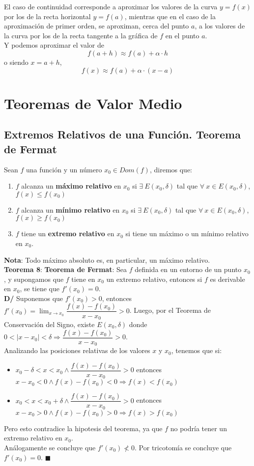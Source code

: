 \documentclass[11pt,a4paper]{article}
\newcommand*{\QEDA}{\null\nobreak\hfill\ensuremath{\blacksquare}}
\begin{document}
\noindent El caso de continuidad corresponde a aproximar los valores de la curva $y=f(x)$ por los de la recta horizontal $y=f(a)$, mientras que en el caso de la aproximaci\'on de primer orden, se aproximan, cerca del punto $a$, a los valores de la curva por los de la recta tangente a la gr\'afica de $f$ en el punto $a$.\\

\noindent Y podemos aproximar el valor de $$f(a+h) \approx f(a) + \alpha \cdot h$$ o siendo $x = a+h$, $$f(x) \approx f(a) + \alpha \cdot (x-a)$$

\newpage
\section{Teoremas de Valor Medio}
\subsection{Extremos Relativos de una Funci\'on. Teorema de Fermat}
Sean $f$ una funci\'on y un n\'umero $x_0 \in Dom(f)$, diremos que:
\begin{enumerate}
\item $f$ alcanza un \textbf{m\'aximo relativo} en $x_0$ si $\exists\ E(x_0, \delta)$ tal que $\forall\ x\in E(x_0, \delta)$, $f(x) \leq f(x_0)$
\item $f$ alcanza un \textbf{m\'inimo relativo} en $x_0$ si $\exists\ E(x_0, \delta)$ tal que $\forall\ x\in E(x_0, \delta)$, $f(x) \geq f(x_0)$
\item $f$ tiene un \textbf{extremo relativo} en $x_0$ si tiene un m\'aximo o un m\'inimo relativo en $x_0$.
\end{enumerate}
\textbf{Nota}: Todo m\'aximo absoluto es, en particular, un m\'aximo relativo.\\

\noindent \textbf{Teorema 8}: \textbf{Teorema de Fermat}:
Sea $f$ definida en un entorno de un punto $x_0$, y supongamos que $f$ tiene en $x_0$ un extremo relativo, entonces si $f$ es derivable en $x_0$, se tiene que $f'(x_0)=0$.\\
\textbf{D/} Suponemos que $f'(x_0) > 0$, entonces $f'(x_0) = \displaystyle{\lim_{x \to x_0} \dfrac{f(x)-f(x_0)}{x-x_0} > 0}$. Luego, por el Teorema de Conservaci\'on del Signo, existe $E(x_0, \delta)$ donde $0<|x-x_0|<\delta \Rightarrow \dfrac{f(x)-f(x_0)}{x-x_0} > 0$.\\
Analizando las posiciones relativas de los valores $x$ y $x_0$, tenemos que si:
\begin{itemize}
\item $x_0 - \delta < x < x_0 \land \dfrac{f(x)-f(x_0)}{x-x_0} > 0$ entonces $x-x_0 < 0 \land f(x)-f(x_0)<0 \Rightarrow f(x)<f(x_0)$
\item $x_0 < x < x_0 + \delta \land \dfrac{f(x)-f(x_0)}{x-x_0} > 0$ entonces $x-x_0 > 0 \land f(x)-f(x_0)>0 \Rightarrow f(x)>f(x_0)$
\end{itemize}
Pero esto contradice la hipotesis del teorema, ya que $f$ no podr\'ia tener un extremo relativo en $x_0$.\\
An\'alogamente se concluye que $f'(x_0) \not < 0$. Por tricotom\'ia se concluye que $f'(x_0) = 0$. \QEDA\\
\end{document}
